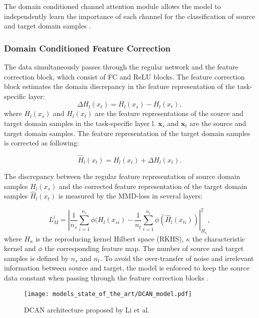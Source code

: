 The domain conditioned channel attention module allows the model to independently learn the importance of each channel for the classification of source and target domain samples \cite{li2020}.


\subsubsection{Domain Conditioned Feature Correction}
The data simultaneously passes through the regular network and the feature correction block, which consist of FC and ReLU blocks. The feature correction block estimates the domain discrepancy in the feature representation of the task-specific layer:
\begin{equation}
    \Delta H_{l}(x_{t}) = H_{l}(x_{s}) - H_{l}(x_{t}),
\end{equation}
where $H_{l}(x_{s})$ and $H_{l}(x_{t})$ are the feature representations of the source and target domain samples in the task-specific layer l. $\pmb{x}_{s}$ and $\pmb{x}_{t}$ are the source and target domain samples. The feature representation of the target domain samples is corrected as following:

\begin{equation}
    \hat{H}_{l}(x_{t}) = H_{l}(x_{t}) + \Delta H_{l}(x_{t}).
\end{equation}

The discrepancy between the regular feature representation of source domain samples $H_{l}(x_{s})$ and the corrected feature representation of the target domain samples $\hat{H}_{l}(x_{t})$ is measured by the MMD-loss in several layers:

\begin{equation}
    L_{M}^{l} = |\frac{1}{n_s} \sum_{i=1}^{n_{s}} \phi(H_{l}(x_{si}) - \frac{1}{n_t} \sum_{i=1}^{n_{t}} \phi(\hat{H}_{l}(x_{ti}))|_{H_{\kappa}}^{2}, 
\end{equation}
where $H_{\kappa}$ is the reproducing kernel Hilbert space (RKHS), $\kappa$ the characteristic kernel and $\phi$ the corresponding feature map. The number of source and target samples is defined by $n_{s}$ and $n_{t}$. To avoid the over-transfer of noise and irrelevant information between source and target, the model is enforced to keep the source data constant when passing through the feature correction blocks \cite{li2020}.

\begin{figure}[H]
  \centering
  \texttt{[image: models\_state\_of\_the\_art/DCAN\_model.pdf]}
  \caption{DCAN architecture proposed by Li et al. \cite{li2020}}
  \label{fig:DCAN_model}
\end{figure}

